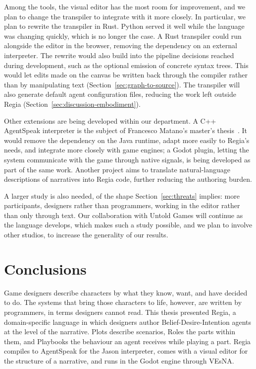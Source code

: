 Among the tools, the visual editor has the most room for improvement, and we plan to change the transpiler to integrate with it more closely. In particular, we plan to rewrite the transpiler in Rust. Python served it well while the language was changing quickly, which is no longer the case. A Rust transpiler could run alongside the editor in the browser, removing the dependency on an external interpreter. The rewrite would also build into the pipeline decisions reached during development, such as the optional emission of concrete syntax trees. This would let edits made on the canvas be written back through the compiler rather than by manipulating text (Section~\ref{sec:graph-to-source}). The transpiler will also generate default agent configuration files, reducing the work left outside Regia (Section~\ref{sec:discussion-embodiment}).

Other extensions are being developed within our department. A C++ AgentSpeak interpreter is the subject of Francesco Matano's master's thesis~\cite{Matano2026}. It would remove the dependency on the Java runtime, adapt more easily to Regia's needs, and integrate more closely with game engines; a Godot plugin, letting the system communicate with the game through native signals, is being developed as part of the same work. Another project aims to translate natural-language descriptions of narratives into Regia code, further reducing the authoring burden.

A larger study is also needed, of the shape Section~\ref{sec:threats} implies: more participants, designers rather than programmers, working in the editor rather than only through text. Our collaboration with Untold Games will continue as the language develops, which makes such a study possible, and we plan to involve other studios, to increase the generality of our results.

\section{Conclusions}
\label{sec:conclusions}
 
Game designers describe characters by what they know, want, and have decided to do. The systems that bring those characters to life, however, are written by programmers, in terms designers cannot read. This thesis presented Regia, a domain-specific language in which designers author Belief-Desire-Intention agents at the level of the narrative. Plots describe scenarios, Roles the parts within them, and Playbooks the behaviour an agent receives while playing a part. Regia compiles to AgentSpeak for the Jason interpreter, comes with a visual editor for the structure of a narrative, and runs in the Godot engine through VEsNA.
 
